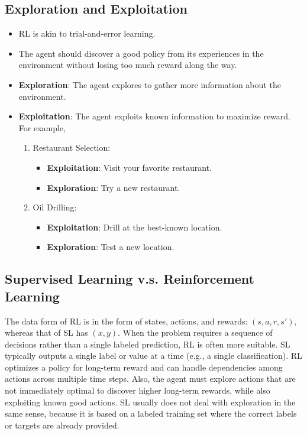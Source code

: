 \subsection{Exploration and Exploitation}
\begin{itemize}
    \item RL is akin to trial-and-error learning.
    \item The agent should discover a good policy from its experiences in the environment without losing too much reward along the way.
    \item \textbf{Exploration}: The agent explores to gather more information about the environment.
    \item \textbf{Exploitation}: The agent exploits known information to maximize reward. For example,
    \begin{enumerate}
        \item Restaurant Selection:
        \begin{itemize}
            \item \textbf{Exploitation}: Visit your favorite restaurant.
            \item \textbf{Exploration}: Try a new restaurant.
        \end{itemize}
        \item Oil Drilling:
        \begin{itemize}
            \item \textbf{Exploitation}: Drill at the best-known location.
            \item \textbf{Exploration}: Test a new location.
        \end{itemize}
    \end{enumerate}
\end{itemize}

\subsection{Supervised Learning v.s. Reinforcement Learning}

The data form of RL is in the form of states, actions, and rewards: \((s, a, r, s')\), whereas that of SL has $(x, y)$. When the problem requires a sequence of decisions rather than a single labeled prediction, RL is often more suitable. SL typically outputs a single label or value at a time (e.g., a single classification). RL optimizes a policy for long-term reward and can handle dependencies among actions across multiple time steps. Also, the agent must explore actions that are not immediately optimal to discover higher long-term rewards, while also exploiting known good actions. SL usually does not deal with exploration in the same sense, because it is based on a labeled training set where the correct labels or targets are already provided.

